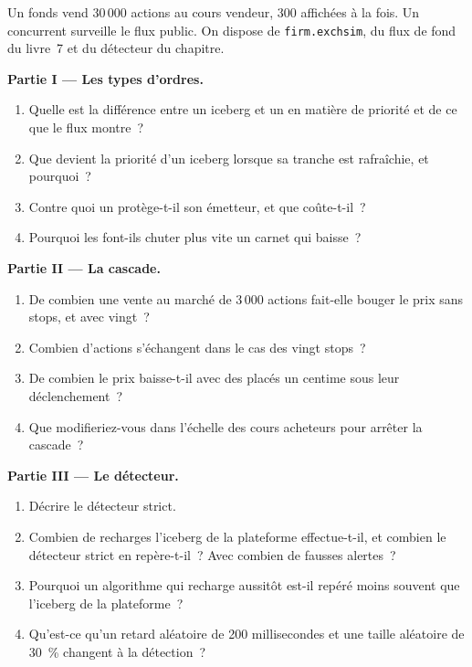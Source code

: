 \begin{problem}\label{pb:mx:order-types-and-their-uses:1}
Un fonds vend 30\,000 actions au cours vendeur, 300 affichées à la fois. Un concurrent surveille le flux public. On dispose de \texttt{firm.exchsim}, du flux de fond du livre~7
et du détecteur du chapitre.

\medskip\noindent\textbf{Partie I --- Les types d'ordres.}
\begin{enumerate}
\item Quelle est la différence entre un iceberg et un  en matière de priorité et de ce que le flux montre~?
\item Que devient la priorité d'un iceberg lorsque sa tranche est rafraîchie, et pourquoi~?
\item Contre quoi un  protège-t-il son émetteur, et que coûte-t-il~?
\item Pourquoi les  font-ils chuter plus vite un carnet qui baisse~?
\end{enumerate}

\medskip\noindent\textbf{Partie II --- La cascade.}
\begin{enumerate}[resume]
\item De combien une vente au marché de 3\,000 actions fait-elle bouger le prix sans stops, et avec vingt~?
\item Combien d'actions s'échangent dans le cas des vingt stops~?
\item De combien le prix baisse-t-il avec des  placés un centime sous leur déclenchement~?
\item Que modifieriez-vous dans l'échelle des cours acheteurs pour arrêter la cascade~?
\end{enumerate}

\medskip\noindent\textbf{Partie III --- Le détecteur.}
\begin{enumerate}[resume]
\item Décrire le détecteur strict.
\item Combien de recharges l'iceberg de la plateforme effectue-t-il, et combien le détecteur strict en repère-t-il~? Avec combien de fausses alertes~?
\item Pourquoi un algorithme qui recharge aussitôt est-il repéré moins souvent que l'iceberg de la plateforme~?
\item Qu'est-ce qu'un retard aléatoire de 200 millisecondes et une taille aléatoire de 30~\% changent à la détection~?
\end{enumerate}


\end{problem}
